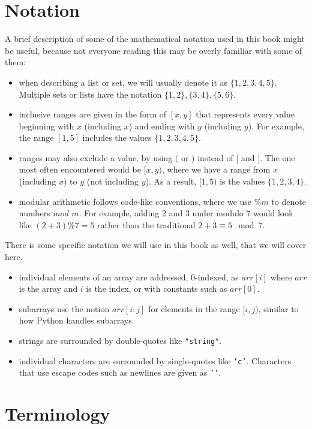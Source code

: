 \section*{Notation}

A brief description of some of the mathematical notation used in this book might be useful, because not everyone reading this may be overly familiar with some of them:
\begin{itemize}
\item when describing a list or set, we will usually denote it as $\{1,2,3,4,5\}$. Multiple sets or lists have the notation $\{1,2\},\{3,4\},\{5,6\}$.
\item inclusive ranges are given in the form of $[x,y]$ that represents every value beginning with $x$ (including $x$) and ending with $y$ (including $y$). For example, the range $[1,5]$ includes the values $\{1,2,3,4,5\}$.
\item ranges may also exclude a value, by using $($ or $)$ instead of $[$ and $]$. The one most often encountered would be $[x,y)$, where we have a range from $x$ (including $x$) to $y$ (not including $y$). As a result, $[1,5)$ is the values $\{1,2,3,4\}$.
\item modular arithmetic follows code-like conventions, where we use $\%m$ to denote numbers $mod$ $m$. For example, adding $2$ and $3$ under modulo $7$ would look like $(2 + 3) \% 7 = 5$ rather than the traditional $2+3 \equiv 5 \mod{7}$.
\end{itemize}

There is some specific notation we will use in this book as well, that we will cover here.
\begin{itemize}
\item individual elements of an array are addressed, 0-indexed, as $arr[i]$ where $arr$ is the array and $i$ is the index, or with constants such as $arr[0]$.
\item subarrays use the notion $arr[i:j]$ for elements in the range $[i,j)$, similar to how Python handles subarrays.
\item strings are surrounded by double-quotes like \texttt{"string"}.
\item individual characters are surrounded by single-quotes like \texttt{'c'}. Characters that use escape codes such as newlines are given as \texttt{'\n'}.
\end{itemize}

\section*{Terminology}

